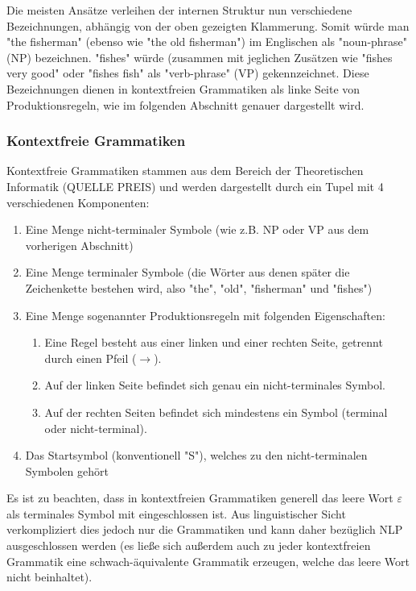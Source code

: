 \documentclass[12pt]{paper}
\begin{document}
Die meisten Ansätze verleihen der internen Struktur nun verschiedene Bezeichnungen, abhängig von der oben gezeigten Klammerung. Somit würde man "the fisherman" (ebenso wie "the old fisherman") im Englischen als "noun-phrase" (NP) bezeichnen. "fishes" würde (zusammen mit jeglichen Zusätzen wie "fishes very good" oder "fishes fish" als "verb-phrase" (VP) gekennzeichnet. Diese Bezeichnungen dienen in kontextfreien Grammatiken als linke Seite von Produktionsregeln, wie im folgenden Abschnitt genauer dargestellt wird.

\subsubsection{Kontextfreie Grammatiken}
Kontextfreie Grammatiken stammen aus dem Bereich der Theoretischen Informatik (QUELLE PREIS) und werden dargestellt durch ein Tupel mit 4 verschiedenen Komponenten:

\begin{enumerate}
\item Eine Menge nicht-terminaler Symbole (wie z.B. NP oder VP aus dem vorherigen Abschnitt)
\item Eine Menge terminaler Symbole (die Wörter aus denen später die Zeichenkette bestehen wird, also "the", "old", "fisherman" und "fishes")
\item Eine Menge sogenannter Produktionsregeln mit folgenden Eigenschaften:
\begin{enumerate}
\item Eine Regel besteht aus einer linken und einer rechten Seite, getrennt durch einen Pfeil ($\rightarrow$).
\item Auf der linken Seite befindet sich genau ein nicht-terminales Symbol.
\item Auf der rechten Seiten befindet sich mindestens ein Symbol (terminal oder nicht-terminal).
\end{enumerate}
\item Das Startsymbol (konventionell "S"), welches zu den nicht-terminalen Symbolen gehört
\end{enumerate}

Es ist zu beachten, dass in kontextfreien Grammatiken generell das leere Wort $\varepsilon$ als terminales Symbol mit eingeschlossen ist. Aus linguistischer Sicht verkompliziert dies jedoch nur die Grammatiken und kann daher bezüglich NLP ausgeschlossen werden (es ließe sich außerdem auch zu jeder kontextfreien Grammatik eine schwach-äquivalente Grammatik erzeugen, welche das leere Wort nicht beinhaltet).
\end{document}
